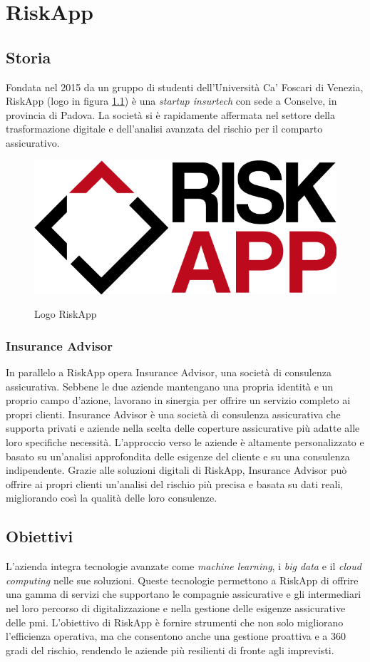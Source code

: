 \chapter{RiskApp}
\label{chap:introduzione}



\section{Storia}
Fondata nel 2015 da un gruppo di studenti dell'Università Ca' Foscari di Venezia, RiskApp (logo in figura \ref{fig:riskapp}) è una \textit{startup insurtech} con sede a Conselve, in provincia di Padova. La società si è rapidamente affermata nel settore della trasformazione digitale e dell'analisi avanzata del rischio per il comparto assicurativo.

\begin{figure}[H]
	\centering
	\includegraphics[alt={Logo docx, xlsx e pdf}, width=0.5\columnwidth]{img/riskapp_logo.png}
	\caption{Logo RiskApp}
	\label{fig:riskapp}
\end{figure}

\subsection{Insurance Advisor}
In parallelo a RiskApp opera Insurance Advisor, una società di consulenza assicurativa. Sebbene le due aziende mantengano una propria identità e un proprio campo d'azione, lavorano in sinergia per offrire un servizio completo ai propri clienti.
Insurance Advisor è una società di consulenza assicurativa che supporta privati e aziende nella scelta delle coperture assicurative più adatte alle loro specifiche necessità. L'approccio verso le aziende è altamente personalizzato e basato su un'analisi approfondita delle esigenze del cliente e su una consulenza indipendente.
Grazie alle soluzioni digitali di RiskApp, Insurance Advisor può offrire ai propri clienti un’analisi del rischio più precisa e basata su dati reali, migliorando così la qualità delle loro consulenze.

\section{Obiettivi}
L'azienda integra tecnologie avanzate come \textit{machine learning}, i \textit{big data} e il \textit{cloud computing} nelle sue soluzioni. Queste tecnologie permettono a RiskApp di offrire una gamma di servizi che supportano le compagnie assicurative e gli intermediari nel loro percorso di digitalizzazione e nella gestione delle esigenze assicurative delle \gls{pmi}. L'obiettivo di RiskApp è fornire strumenti che non solo migliorano l'efficienza operativa, ma che consentono anche una gestione proattiva e a 360 gradi del rischio, rendendo le aziende più resilienti di fronte agli imprevisti.

